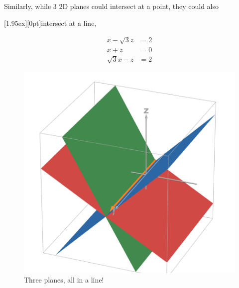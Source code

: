 \documentclass[12pt]{scrartcl}
\begin{document}
Similarly, while 3 2D planes could intersect at a point, they could also

\begin{minipage}{0.48\textwidth}
    \begin{center}\raisebox{0pt}[1.95ex][0pt]{intersect at a line,}\end{center}
    \vspace{-1em}
    \begin{align*}
        x - \sqrt{3}z &= 2 \\
        x + z &= 0 \\
        \sqrt{3}x - z &= 2
    \end{align*}
    \begin{figure}[H]
        \centering
        \includegraphics[scale=0.22]{Three Planes All In a Line.png}
        \caption*{Three planes, all in a line!}
    \end{figure}
\end{minipage}
\hfill
\end{document}
